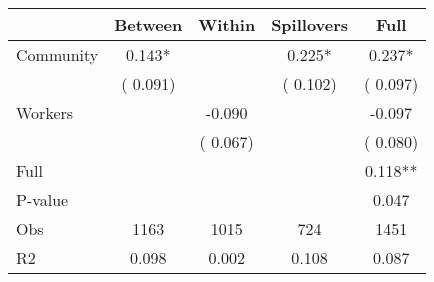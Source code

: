 
\begin{tabular}{l*{4}{c}}\hline&\multicolumn{1}{c}{Between}&\multicolumn{1}{c}{Within}&\multicolumn{1}{c}{Spillovers}&\multicolumn{1}{c}{Full}\\ \hline
 Community             &              0.143*      &                                               &        0.225* &         0.237*                            \\ 
                               &        (       0.091)           &                                       &       (       0.102)     &      (       0.097)                                           \\ 
 Workers       &                                               &       -0.090    &                                &            -0.097                            \\ 
                               &                                               & (       0.067)                  &                                        &      (       0.080)                                           \\ 
\hline                                                                                                                                                                                                                                            
 Full                  &                                               &                                               &                                        &             0.118**                                     \\ 
 P-value               &                                               &                                               &                                        &             0.047                                           \\ 
 Obs                   &               1163               &       1015                       &       724                &              1451                                               \\ 
 R2                    &                      0.098              &              0.002                      &              0.108               &                     0.087                                              \\ 
\hline \end{tabular}                                                                                                                                                                                                              